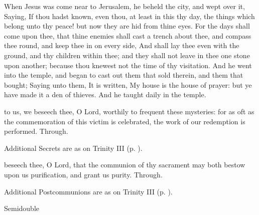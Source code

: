 
 When Jesus was come near to Jerusalem, he beheld the city, and wept over it, Saying, If thou hadst known, even thou, at least in this thy day, the things which belong unto thy peace! but now they are hid from thine eyes. For the days shall come upon thee, that thine enemies shall cast a trench about thee, and compass thee round, and keep thee in on every side, And shall lay thee even with the ground, and thy children within thee; and they shall not leave in thee one stone upon another; because thou knewest not the time of thy visitation. And he went into the temple, and began to cast out them that sold therein, and them that bought; Saying unto them, It is written, My house is the house of prayer: but ye have made it a den of thieves. And he taught daily in the temple.


\secret
{} to us, we beseech thee, O Lord, worthily to frequent these mysteries: for as oft as the commemoration of this victim is celebrated, the work of our redemption is performed. Through.
\begin{rubric}
    Additional Secrets are as on Trinity III (p. \pageref{TrinityIII}).
\end{rubric}


\postcommunion
{} beseech thee, O Lord, that the communion of thy sacrament may both bestow upon us purification, and grant us purity. Through.
\begin{rubric}
    Additional Postcommunions are as on Trinity III (p. \pageref{TrinityIII}).
\end{rubric}



\begin{inhead}
{Semidouble}
\end{inhead}
\par\noindent

